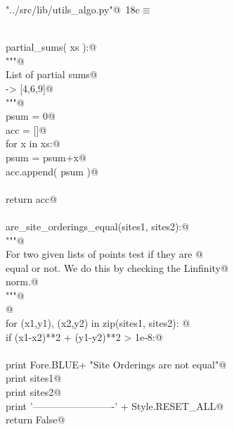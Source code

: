 \documentclass[11.5pt]{report}
\begin{document}
\begin{flushleft} \small\label{scrap12}\raggedright\small
{} \verb@"../src/lib/utils_algo.py"@\nobreak\ {\footnotesize {18c}}$\equiv$
\vspace{-1ex}
\begin{list}{}{} \item
\mbox{}\verb@@\\
\mbox{}\verb@def partial_sums( xs ):@\\
\mbox{}\verb@    """@\\
\mbox{}\verb@    List of partial sums@\\
\mbox{}\verb@    [4,2,3] -> [4,6,9]@\\
\mbox{}\verb@    """@\\
\mbox{}\verb@    psum = 0@\\
\mbox{}\verb@    acc = []@\\
\mbox{}\verb@    for x in xs:@\\
\mbox{}\verb@        psum = psum+x@\\
\mbox{}\verb@        acc.append( psum )@\\
\mbox{}\verb@@\\
\mbox{}\verb@    return acc@\\
\mbox{}\verb@@\\
\mbox{}\verb@def are_site_orderings_equal(sites1, sites2):@\\
\mbox{}\verb@    """@\\
\mbox{}\verb@    For two given lists of points test if they are @\\
\mbox{}\verb@    equal or not. We do this by checking the Linfinity@\\
\mbox{}\verb@    norm.@\\
\mbox{}\verb@    """@\\
\mbox{}\verb@    @\\
\mbox{}\verb@    for (x1,y1), (x2,y2) in zip(sites1, sites2): @\\
\mbox{}\verb@        if (x1-x2)**2 + (y1-y2)**2 > 1e-8:@\\
\mbox{}\verb@@\\
\mbox{}\verb@            print Fore.BLUE+ "Site Orderings are not equal"@\\
\mbox{}\verb@            print sites1@\\
\mbox{}\verb@            print sites2@\\
\mbox{}\verb@            print '-------------------------' + Style.RESET_ALL@\\
\mbox{}\verb@            return False@\\

\end{list}
\end{flushleft}
\end{document}

